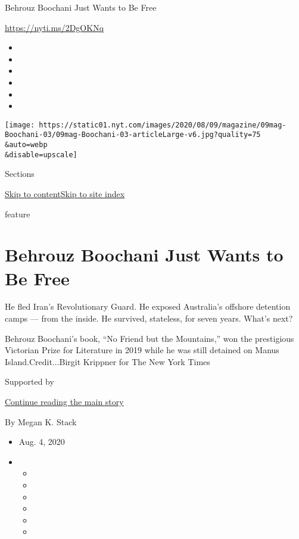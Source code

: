 Behrouz Boochani Just Wants to Be Free

\href{https://nyti.ms/2DgOKNq}{https://nyti.ms/2DgOKNq}

\begin{itemize}
\item
\item
\item
\item
\item
\item
\end{itemize}

\texttt{[image: https://static01.nyt.com/images/2020/08/09/magazine/09mag-Boochani-03/09mag-Boochani-03-articleLarge-v6.jpg?quality=75\\\&auto=webp\\\&disable=upscale]}

Sections

\protect\hyperlink{site-content}{Skip to
content}\protect\hyperlink{site-index}{Skip to site index}

feature

\hypertarget{behrouz-boochani-just-wants-to-be-free}{%
\section{Behrouz Boochani Just Wants to Be
Free}\label{behrouz-boochani-just-wants-to-be-free}}

He fled Iran's Revolutionary Guard. He exposed Australia's offshore
detention camps --- from the inside. He survived, stateless, for seven
years. What's next?

Behrouz Boochani's book, ``No Friend but the Mountains,'' won the
prestigious Victorian Prize for Literature in 2019 while he was still
detained on Manus Island.Credit...Birgit Krippner for The New York Times

Supported by

\protect\hyperlink{after-sponsor}{Continue reading the main story}

By Megan K. Stack

\begin{itemize}
\item
  Aug. 4, 2020
\item
  \begin{itemize}
  \item
  \item
  \item
  \item
  \item
  \item
  \end{itemize}
\end{itemize}


